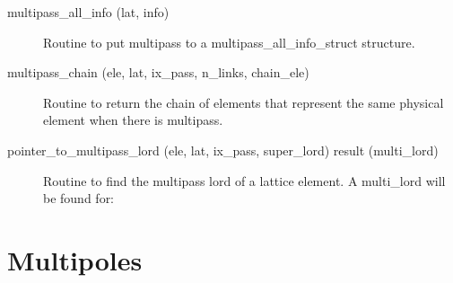 \begin{description}

\label{r:multipass.all.info}
\item[multipass_all_info (lat, info)] \Newline 
Routine to put multipass to a multipass_all_info_struct structure.

\label{r:multipass.chain}
\item[multipass_chain (ele, lat, ix_pass, n_links, chain_ele)] \Newline 
Routine to return the chain of elements that represent the same physical element
when there is multipass.

\label{r:pointer.to.multipass.lord}
\item[pointer_to_multipass_lord (ele, lat, ix_pass, super_lord) result (multi_lord)] \Newline 
Routine to find the multipass lord of a lattice element.
A multi_lord will be found for:

\end{description}

\section{Multipoles}
\label{r:multipoles}

